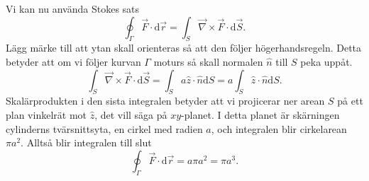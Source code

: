 \documentclass[%
oneside,                 %
final,                   %
10pt]{article}
\newenvironment{doconceexercise}{}{}
\begin{document}
\begin{doconceexercise}
Vi kan nu använda Stokes sats
\begin{equation}
  \oint_\Gamma \vec{F} \cdot \mbox{d}\vec{r} = \int_S \vec{\nabla} \times \vec{F} \cdot
\mbox{d}\vec{S}.
\end{equation}
Lägg märke till att ytan skall orienteras så att den följer högerhandsregeln.  Detta betyder att om vi följer kurvan $\Gamma$ moturs så skall normalen $\hat{n}$ till $S$ peka uppåt.  
\begin{equation}
  \int_S \vec{\nabla} \times \vec{F} \cdot \mbox{d}\vec{S} = \int_S a \hat{z} \cdot 
\hat{n} \mbox{d}S = a \int_S \hat{z} \cdot \hat{n} \mbox{d}S.
\end{equation}
Skalärprodukten i den sista integralen betyder att vi projicerar ner arean $S$ på ett plan vinkelrät mot $\hat{z}$, det vill säga på $xy$-planet.  I detta planet är skärningen cylinderns tvärsnittsyta, en cirkel med radien $a$, och integralen blir cirkelarean $\pi a^2$. Alltså blir integralen till slut
\begin{equation}
  \oint_\Gamma \vec{F} \cdot \mbox{d}\vec{r} = a \pi a^2 = \pi a^3.
\end{equation}


\end{doconceexercise}



\end{document}
